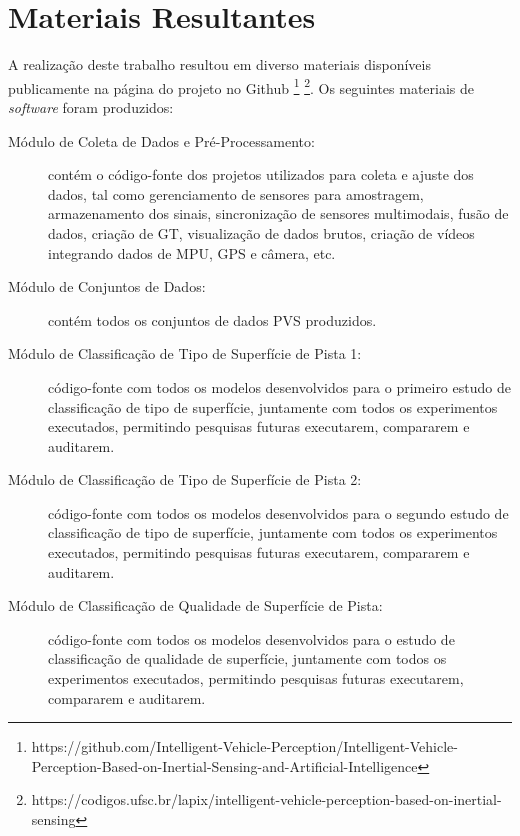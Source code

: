 \chapter{Materiais Resultantes}
\label{cap:materiais_resultantes}

A realização deste trabalho resultou em diverso materiais disponíveis publicamente na página do projeto no Github \footnote{https://github.com/Intelligent-Vehicle-Perception/Intelligent-Vehicle-Perception-Based-on-Inertial-Sensing-and-Artificial-Intelligence} \footnote{https://codigos.ufsc.br/lapix/intelligent-vehicle-perception-based-on-inertial-sensing}. Os seguintes materiais de \textit{software} foram produzidos:

\begin{small}
\begin{description}
	
	\item[Módulo de Coleta de Dados e Pré-Processamento:] contém o código-fonte dos projetos utilizados para coleta e ajuste dos dados, tal como gerenciamento de sensores para amostragem, armazenamento dos sinais, sincronização de sensores multimodais, fusão de dados, criação de GT, visualização de dados brutos, criação de vídeos integrando dados de MPU, GPS e câmera, etc.
	
	\item[Módulo de Conjuntos de Dados:] contém todos os conjuntos de dados PVS produzidos.
	
    \item[Módulo de Classificação de Tipo de Superfície de Pista 1:] código-fonte com todos os modelos desenvolvidos para o primeiro estudo de classificação de tipo de superfície, juntamente com todos os experimentos executados, permitindo pesquisas futuras executarem, compararem e auditarem.
    
    \item[Módulo de Classificação de Tipo de Superfície de Pista 2:] código-fonte com todos os modelos desenvolvidos para o segundo estudo de classificação de tipo de superfície, juntamente com todos os experimentos executados, permitindo pesquisas futuras executarem, compararem e auditarem.
    
    \item[Módulo de Classificação de Qualidade de Superfície de Pista:] código-fonte com todos os modelos desenvolvidos para o estudo de classificação de qualidade de superfície, juntamente com todos os experimentos executados, permitindo pesquisas futuras executarem, compararem e auditarem.
    

\end{description}
\end{small}
